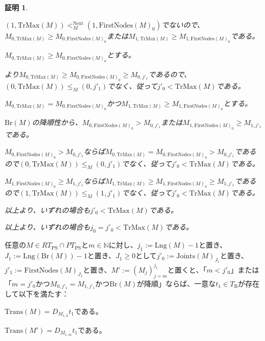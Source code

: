 \documentclass[dvipdfmx,uplatex]{jsarticle}
\theoremstyle{customnonumberbreakfortheorem}
\theoremstyle{customnonumberbreakforproof}
\newtheorem{hideableproof}{証明}
\begin{document}
\begin{hideableproof}
\begin{indented}
\begin{indented}
			\item \((1,\textrm{TrMax}(M)) <_M^{\textrm{Next}} (1,\textrm{FirstNodes}(M)_0)\)でないので、\(M_{0,\textrm{TrMax}(M)} \geq M_{0,\textrm{FirstNodes}(M)_0}\)または\(M_{1,\textrm{TrMax}(M)} \geq M_{1,\textrm{FirstNodes}(M)_0}\)である。
			\item \(M_{0,\textrm{TrMax}(M)} \geq M_{0,\textrm{FirstNodes}(M)_0}\)とする。
			\begin{indented}
				\item {}より\(M_{0,\textrm{TrMax}(M)} \geq M_{0,\textrm{FirstNodes}(M)_0} \geq M_{0,j'_1}\)であるので、\((0,\textrm{TrMax}(M)) \leq_M (0,j'_1)\)でなく、従って\(j'_0 < \textrm{TrMax}(M)\)である。
			\end{indented}
			\item \(M_{0,\textrm{TrMax}(M)} = M_{0,\textrm{FirstNodes}(M)_0}\)かつ\(M_{1,\textrm{TrMax}(M)} \geq M_{1,\textrm{FirstNodes}(M)_0}\)とする。
			\begin{indented}
				\item \(\textrm{Br}(M)\)の降順性から、\(M_{0,\textrm{FirstNodes}(M)_0} > M_{0,j'_1}\)または\(M_{1,\textrm{FirstNodes}(M)_0} \geq M_{1,j'_1}\)である。
				\item \(M_{0,\textrm{FirstNodes}(M)_0} > M_{0,j'_1}\)ならば\(M_{0,\textrm{TrMax}(M)} = M_{0,\textrm{FirstNodes}(M)_0} > M_{0,j'_1}\)であるので\((0,\textrm{TrMax}(M)) \leq_M (0,j'_1)\)でなく、従って\(j'_0 < \textrm{TrMax}(M)\)である。
				\item \(M_{1,\textrm{FirstNodes}(M)_0} \geq M_{1,j'_1}\)ならば\(M_{1,\textrm{TrMax}(M)} \geq M_{1,\textrm{FirstNodes}(M)_0} \geq M_{1,j'_1}\)であるので\((1,\textrm{TrMax}(M)) \leq_M (1,j'_1)\)でなく、従って\(j'_0 < \textrm{TrMax}(M)\)である。
				\item 以上より、いずれの場合も\(j'_0 < \textrm{TrMax}(M)\)である。
			\end{indented}
			\item 以上より、いずれの場合も\(j_0 = j'_0 < \textrm{TrMax}(M)\)である。
		\end{indented}
	\end{indented}
\end{hideableproof}

\begin{lemma}\label{条件(V)の下での終切片とTransの関係}
	任意の\(M \in RT_{\textrm{PS}} \cap PT_{\textrm{PS}}\)と\(m \in \mathbb{N}\)に対し、\(j_1 := \textrm{Lng}(M)-1\)と置き、\(J_1 := \textrm{Lng}(\textrm{Br}(M))-1\)と置き、\(J_1 \geq 0\)として\(j'_0 := \textrm{Joints}(M)_{J_1}\)と置き、\(j'_1 := \textrm{FirstNodes}(M)_{J_1}\)と置き、\(M' := (M_j)_{j=m}^{j_1}\)と置くと、「\(m < j'_0\)」または「\(m = j'_0\)かつ\(M_{0,j'_1} = M_{1,j'_1}\)かつ\(\textrm{Br}(M)\)が降順」ならば、一意な\(t_1 \in T_{\textrm{B}}\)が存在して以下を満たす：
	\begin{penumerate}
		\item \(\textrm{Trans}(M) = D_{M_{1,0}} t_1\)である。
		\item \(\textrm{Trans}(M') = D_{M_{1,m}} t_1\)である。
	\end{penumerate}
\end{lemma}
\end{document}
